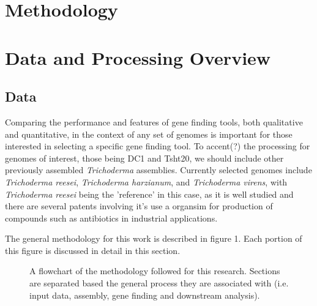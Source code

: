 \section{Methodology}

\section{Data and Processing Overview}

\subsection{Data}

Comparing the performance and features of gene finding tools, both
qualitative and quantitative, in the context of any set of genomes is
important for those interested in selecting a specific gene finding
tool. To accent(?) the processing for genomes of interest, those being
DC1 and Tsht20, we should include other previously assembled
\textit{Trichoderma} assemblies. Currently selected genomes include
\textit{Trichoderma reesei}, \textit{Trichoderma harzianum}, and
\textit{Trichoderma virens}, with \textit{Trichoderma reesei} being
the 'reference' in this case, as it is well studied and there are
several patents involving it's use a organsim for production of
compounds such as antibiotics in industrial applications.

The general methodology for this work is described in figure 1. Each
portion of this figure is discussed in detail in this section.

\begin{figure}
  \begin{center}
  \end{center}
  \caption{A flowchart of the methodology followed for this
    research. Sections are separated based the general process they
    are associated with (i.e. input data, assembly, gene finding and
    downstream analysis).}
\end{figure}


